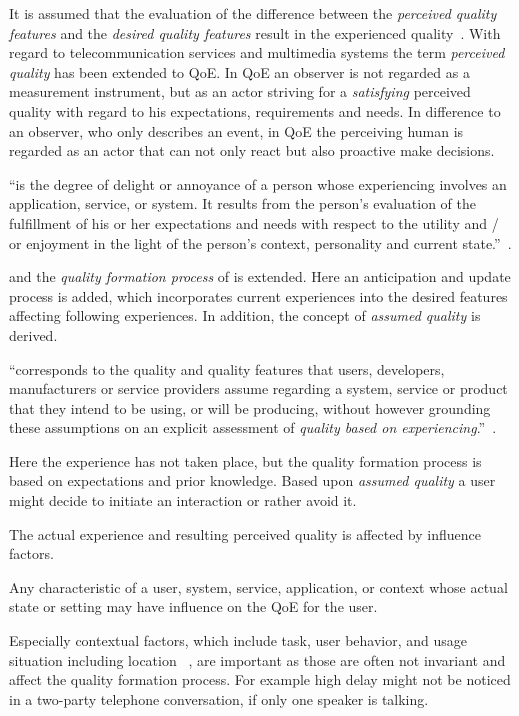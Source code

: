 It is assumed that the evaluation of the difference between the \emph{perceived quality features} and the \emph{desired quality features} result in the experienced quality~\citet[p. 23]{moller_quality_2014}.
With regard to telecommunication services and multimedia systems the term \emph{perceived quality} has been extended to \acf{QoE}.
In \ac{QoE} an observer is not regarded as a measurement instrument, but as an actor striving for a \emph{satisfying} perceived quality with regard to his expectations, requirements and needs.
In difference to an observer, who only describes an event, in \ac{QoE} the perceiving human is regarded as an actor that can not only react but also proactive make decisions.

\begin{definition}
``is the degree of delight or annoyance of a person whose experiencing involves an application, service, or system.
It results from the person’s evaluation of the fulfillment of his or her expectations and needs with respect to the utility and / or enjoyment in the light of the person’s context, personality and current state.''~\citep[p. 21]{moller_quality_2014}.
\end{definition}

\citet{raake_speech_2006} and \citet{moller_quality_2014} the \emph{quality formation process} of \citet{jekosch_voice_2005} is extended.
Here an anticipation and update process is added, which incorporates current experiences into the desired features affecting following experiences.
In addition, the concept of \emph{assumed quality} is derived.
\begin{definition}\label{def:assumedquality}
``corresponds to the quality and quality features that users, developers, manufacturers or service providers assume regarding a system, service or product that they intend to be using, or will be producing, without however grounding these assumptions on an explicit assessment of \textit{quality based on experiencing}.''~\citep[p. 20]{moller_quality_2014}.
\end{definition}
Here the experience has not taken place, but the quality formation process is based on expectations and prior knowledge.
Based upon \emph{assumed quality} a user might decide to initiate an interaction or rather avoid it.

The actual experience and resulting perceived quality is affected by influence factors.
\begin{definition}
Any characteristic of a user, system, service, application, or context whose actual state or setting may have influence on the \ac{QoE} for the user.~\citep[p. 56]{moller_quality_2014-1} %
\end{definition}
Especially contextual factors, which include task, user behavior, and usage situation including location ~\citep[p. 56]{moller_quality_2014-1}, are important as those are often not invariant and affect the quality formation process.
For example high delay might not be noticed in a two-party telephone conversation, if only one speaker is talking.

